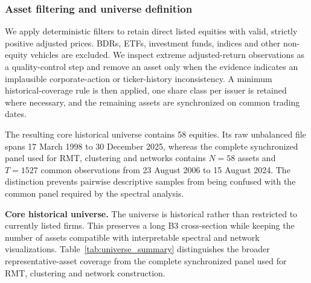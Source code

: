 \subsubsection{Asset filtering and universe definition}
\label{subsec:asset_filtering}

We apply deterministic filters to retain direct listed equities with valid, strictly positive adjusted prices. BDRs, ETFs, investment funds, indices and other non-equity vehicles are excluded. We inspect extreme adjusted-return observations as a quality-control step and remove an asset only when the evidence indicates an implausible corporate-action or ticker-history inconsistency. A minimum historical-coverage rule is then applied, one share class per issuer is retained where necessary, and the remaining assets are synchronized on common trading dates.

The resulting core historical universe contains 58 equities. Its raw unbalanced file spans 17 March 1998 to 30 December 2025, whereas the complete synchronized panel used for RMT, clustering and networks contains $N=58$ assets and $T=1527$ common observations from 23 August 2006 to 15 August 2024. The distinction prevents pairwise descriptive samples from being confused with the common panel required by the spectral analysis.

\noindent\textbf{Core historical universe.} The universe is historical rather than restricted to currently listed firms. This preserves a long B3 cross-section while keeping the number of assets compatible with interpretable spectral and network visualizations. Table~\ref{tab:universe_summary} distinguishes the broader representative-asset coverage from the complete synchronized panel used for RMT, clustering and network construction.

\begin{center}
\label{tab:universe_summary}
\end{center}
\GlobalPrecisionNote


